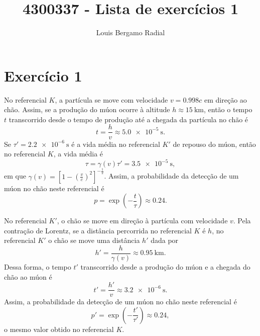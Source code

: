 \documentclass[12pt,a4paper]{article}
\title{4300337 - Lista de exercícios 1}
\author{Louis Bergamo Radial}
\numberwithin{equation}{section}
\begin{document}
\maketitle
\section*{Exercício 1}
No referencial \(K\), a partícula se move com velocidade \(v = 0.998c\) em direção ao chão. Assim, se a produção do múon ocorre à altitude \(h \approx \SI{15}{\kilo\meter}\), então o tempo \(t\) transcorrido desde o tempo de produção até a chegada da partícula no chão é
\begin{equation*}
    t = \frac{h}{v} \approx \SI{5.0e-5}{\second}.
\end{equation*}
Se \(\tau' = \SI{2.2e-6}{\second}\) é a vida média no referencial \(K'\) de repouso do múon, então no referencial \(K\), a vida média é
\begin{equation*}
    \tau = \gamma(v)\tau' = \SI{3.5e-5}{\second},
\end{equation*}
em que \(\gamma(v) = \left[1 - \left(\frac{v}{c}\right)^2\right]^{-\frac12}\).
Assim, a probabilidade da detecção de um múon no chão neste referencial é
\begin{equation*}
    p = \exp{\left(-\frac{t}{\tau}\right)} \approx 0.24.
\end{equation*}

No referencial \(K'\), o chão se move em direção à partícula com velocidade \(v\). Pela contração de Lorentz, se a distância percorrida no referencial \(K\) é \(h\), no referencial \(K'\) o chão se move uma distância \(h'\) dada por
\begin{equation*}
    h' = \frac{h}{\gamma(v)} \approx \SI{0.95}{\kilo\meter}.
\end{equation*}
Dessa forma, o tempo \(t'\) transcorrido desde a produção do múon e a chegada do chão ao múon é
\begin{equation*}
    t' = \frac{h'}{v} \approx \SI{3.2e-6}{\second}.
\end{equation*}
Assim, a probabilidade da detecção de um múon no chão neste referencial é
\begin{equation*}
    p' = \exp{\left(-\frac{t'}{\tau'}\right)} \approx 0.24,
\end{equation*}
o mesmo valor obtido no referencial \(K\).
\end{document}
